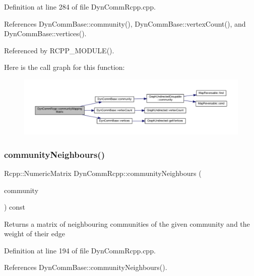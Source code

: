 Definition at line 284 of file Dyn\+Comm\+Rcpp.\+cpp.



References Dyn\+Comm\+Base\+::community(), Dyn\+Comm\+Base\+::vertex\+Count(), and Dyn\+Comm\+Base\+::vertices().



Referenced by R\+C\+P\+P\+\_\+\+M\+O\+D\+U\+L\+E().

Here is the call graph for this function\+:
\nopagebreak
\begin{figure}[H]
\begin{center}
\leavevmode
\includegraphics[width=350pt]{classDynCommRcpp_aaa996ab5e558887d3bc5394af78a2e95_cgraph}
\end{center}
\end{figure}
\mbox{\label{classDynCommRcpp_ad23168e5fa7cf85d5508c646f3e39b9b}} 
\subsubsection{\texorpdfstring{community\+Neighbours()}{communityNeighbours()}}
{\footnotesize\ttfamily Rcpp\+::\+Numeric\+Matrix Dyn\+Comm\+Rcpp\+::community\+Neighbours (\begin{DoxyParamCaption}\item[{\hyperlink{graphUndirectedGroupable_8h_a914da95c9ea7f14f4b7f875c36818556}{type\+Community}}]{community }\end{DoxyParamCaption}) const\hspace{0.3cm}{\ttfamily [inline]}}

\begin{DoxyReturn}{Returns}
a matrix of neighbouring communities of the given community and the weight of their edge 
\end{DoxyReturn}


Definition at line 194 of file Dyn\+Comm\+Rcpp.\+cpp.



References Dyn\+Comm\+Base\+::community\+Neighbours().



